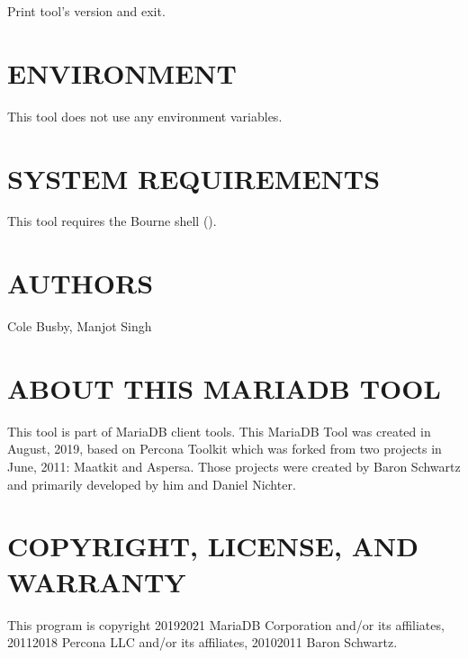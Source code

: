 \documentclass[letterpaper,10pt,english]{sphinxmanual}
\begin{document}
\begin{fulllineitems}
\label{\detokenize{mariadb-summary:cmdoption-mariadb-summary-version}}
\sphinxAtStartPar
Print tool’s version and exit.

\end{fulllineitems}



\section{ENVIRONMENT}
\label{\detokenize{mariadb-summary:environment}}
\sphinxAtStartPar
This tool does not use any environment variables.


\section{SYSTEM REQUIREMENTS}
\label{\detokenize{mariadb-summary:system-requirements}}
\sphinxAtStartPar
This tool requires the Bourne shell ().


\section{AUTHORS}
\label{\detokenize{mariadb-summary:authors}}
\sphinxAtStartPar
Cole Busby, Manjot Singh


\section{ABOUT THIS MARIADB TOOL}
\label{\detokenize{mariadb-summary:about-this-mariadb-tool}}
\sphinxAtStartPar
This tool is part of MariaDB client tools. This MariaDB Tool was created in
August, 2019, based on Percona Toolkit which was
forked from two projects in June, 2011: Maatkit and Aspersa.  Those projects
were created by Baron Schwartz and primarily developed by him and Daniel Nichter.


\section{COPYRIGHT, LICENSE, AND WARRANTY}
\label{\detokenize{mariadb-summary:copyright-license-and-warranty}}
\sphinxAtStartPar
This program is copyright 2019\sphinxhyphen{}2021 MariaDB Corporation and/or its affiliates,
2011\sphinxhyphen{}2018 Percona LLC and/or its affiliates, 2010\sphinxhyphen{}2011 Baron Schwartz.
\end{document}
